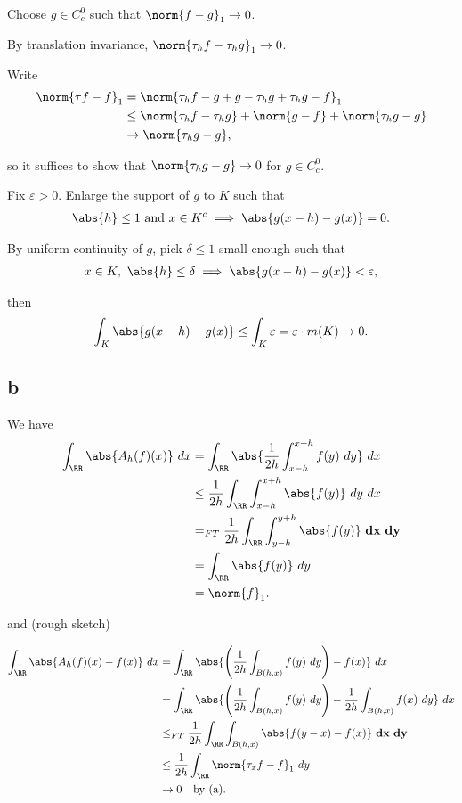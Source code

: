 Choose \(g\in C_c^0\) such that \(\norm{f- g}_1 \to 0\).

By translation invariance, \(\norm{\tau_h f - \tau_h g}_1 \to 0\).

Write \begin{align*}
\norm{\tau f - f}_1 
&= \norm{\tau_h f - g + g - \tau_h g + \tau_h g - f}_1 \\
&\leq \norm{\tau_h f - \tau_h g} + \norm{g - f} + \norm{\tau_h g - g} \\
&\to \norm{\tau_h g - g}
,\end{align*}

so it suffices to show that \(\norm{\tau_h g - g} \to 0\) for
\(g\in C_c^0\).

Fix \(\varepsilon > 0\). Enlarge the support of \(g\) to \(K\) such that
\begin{align*}
\abs{h} \leq 1 \text{ and } x \in K^c \implies \abs{g(x-h) - g(x)} = 0
.\end{align*}

By uniform continuity of \(g\), pick \(\delta \leq 1\) small enough such
that
\begin{align*}
x\in K, ~\abs{h} \leq \delta \implies \abs{g(x-h) -g(x)} < \varepsilon
,\end{align*}

then
\begin{align*}
\int_K \abs{g(x-h) - g(x)} \leq \int_K \varepsilon = \varepsilon \cdot m(K) \to 0.
\end{align*}

\hypertarget{b-3}{%
\subsection{b}\label{b-3}}

We have \begin{align*}
\int_\RR \abs{A_h(f)(x)} ~dx 
&= \int_\RR \abs{\frac{1}{2h} \int_{x-h}^{x+h} f(y)~dy} ~dx \\
&\leq \frac{1}{2h} \int_\RR \int_{x-h}^{x+h} \abs{f(y)} ~dy ~dx    \\
&=_{FT} \frac{1}{2h} \int_\RR \int_{y-h}^{y+h} \abs{f(y)} ~\mathbf{dx} ~\mathbf{dy}    \\
&= \int_\RR \abs{f(y)} ~{dy} \\
&= \norm{f}_1
.\end{align*}

and (rough sketch)

\begin{align*}
\int_\RR \abs{A_h(f)(x) - f(x)} ~dx 
&= \int_\RR \abs{ \left(\frac{1}{2h} \int_{B(h, x)} f(y)~dy\right) - f(x)}~dx \\
&= \int_\RR \abs{ \left(\frac{1}{2h} \int_{B(h, x)} f(y)~dy\right) - \frac{1}{2h}\int_{B(h, x)} f(x) ~dy}~dx \\
&\leq_{FT} \frac{1}{2h} \int_\RR  \int_{B(h, x)}\abs{ f(y-x) - f(x)} ~\mathbf{dx} ~\mathbf{dy} \\
&\leq \frac 1 {2h} \int_\RR \norm{\tau_x f - f}_1 ~dy \\
&\to 0 \quad\text{by (a)}
.\end{align*}

